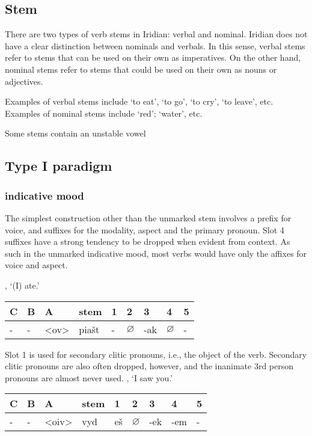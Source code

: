 \subsection{Stem}
There are two types of verb stems in Iridian: verbal and nominal. Iridian does not have a clear distinction between nominals and verbals. In this sense, verbal stems refer to stems that can be used on their own as imperatives. On the other hand, nominal stems refer to stems that could be used on their own as nouns or adjectives.
\par Examples of verbal stems include  `to eat',  `to go',  `to cry',  `to leave', etc. Examples of nominal stems include  `red';  `water', etc.
\par Some stems contain an unstable vowel


\subsection{Type I paradigm}

\subsubsection{indicative mood}
\par The simplest construction other than the unmarked stem involves a prefix for voice, and suffixes for the modality, aspect and the primary pronoun. Slot 4 suffixes have a strong tendency to be dropped when evident from context. As such in the unmarked indicative mood, most verbs would have only the affixes for voice and aspect.

\ex {}, `(I) ate.'
\begin{center}
	\small
	\begin{tabu}to \textwidth{MMMM[1.5]MMMMM}
		\toprule
		C&B&A&{\sc stem}&1&2&3&4&5\\
		\midrule
		\addlinespace
		-&-&<ov>&pia\v{s}t&-&$\varnothing$&-ak&$\varnothing$&-\\
		\bottomrule
	\end{tabu}
\end{center}
\xe

\par Slot 1 is used for secondary clitic pronouns, i.e., the object of the verb. Secondary clitic pronouns are also often dropped, however, and the inanimate 3rd person pronouns are almost never used.
\ex {}, `I saw you.'
\begin{center}
	\small
	\begin{tabu}to \textwidth{MMMM[1.5]MMMMM}
		\toprule
		C&B&A&{\sc stem}&1&2&3&4&5\\
		\midrule
		\addlinespace
		-&-&<oiv>&vyd&e\v{s}&$\varnothing$&-ek&-em&-\\
		\bottomrule
	\end{tabu}
\end{center}

